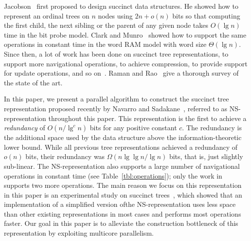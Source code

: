 Jacobson~\cite{j1989} first proposed to design succinct data structures.
He showed how to represent an ordinal trees on $n$ nodes using $2n+o(n)$ bits so
that computing the first child, the next sibling or the parent of any given node
takes $O(\lg n)$ time in the bit probe model.
Clark and Munro~\cite{cm1996} showed how to support the same operations in
constant time in the word RAM model with word size $\Theta(\lg n)$.
Since then, a lot of work has been done on succinct tree representations, to
support more navigational operations, to achieve compression, to provide support
for update operations, and so
on~\cite{mr1997,bdmr1999,grr2004,jss2007,ly2008,hms2012,fm2014,Navarro:2014:FFS:2620785.2601073}.
Raman and Rao~\cite{rr2013} give a thorough survey of the state of the art.

In this paper, we present a parallel algorithm to construct the succinct tree
representation proposed recently by Navarro and
Sadakane~\cite{Navarro:2014:FFS:2620785.2601073}, referred to as
NS-representation throughout this paper.
This representation is the first to achieve a {\em redundancy}
of $O(n/\lg^c n)$ bits for any positive constant $c$.
The redundancy is the additional space used by the data structure above the
information-theoretic lower bound.
While all previous tree representations achieved a redundancy of $o(n)$ bits,
their redundancy was $\Omega(n \lg\lg n / \lg n)$ bits, that is, just slightly
sub-linear.
The NS-representation also supports a large number of
navigational operations in constant time (see Table~\ref{tbl:operations}); only
the work in \cite{hms2012,fm2014} supports two more operations.
The main reason we focus on this representation in this paper is an experimental
study on succinct trees~\cite{ACNSalenex10}, which showed that an implementation
of a simplified version ofthe NS-representation uses less space than other
existing representations in most cases and performs most operations faster.
Our goal in this paper is to alleviate the construction bottleneck of this
representation by exploiting multicore parallelism.

